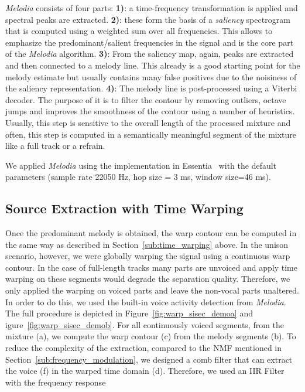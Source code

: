 \emph{Melodia} consists of four parts:
\noindent\textbf{1)}: a time-frequency transformation is applied and spectral peaks are extracted.
\textbf{2)}: these form the basis of a \emph{saliency} spectrogram that is computed using a weighted sum over all frequencies. This allows to emphasize the predominant/salient frequencies in the signal and is the core part of the \emph{Melodia} algorithm.
\textbf{3)}: From the saliency map, again, peaks are extracted and then connected to a melody line. This already is a good starting point for the melody estimate but usually contains many false positives due to the noisiness of the saliency representation.
\textbf{4)}: The melody line is post-processed using a Viterbi decoder.
The purpose of it is to filter the contour by removing outliers, octave jumps and improves the smoothness of the contour using a number of heuristics.
Usually, this step is sensitive to the overall length of the processed mixture and often, this step is computed in a semantically meaningful segment of the mixture like a full track or a refrain.
\par
We applied \emph{Melodia} using the implementation in Essentia~\cite{bogdanov13} with the default parameters (sample rate 22050 Hz, hop size = 3 ms, window size=46 ms).

\subsection{Source Extraction with Time Warping}

Once the predominant melody is obtained, the warp contour can be computed in the same way as described in Section~\ref{sub:time_warping} above.
In the unison scenario, however, we were globally warping the signal using a continuous warp contour.
In the case of full-length tracks many parts are unvoiced and apply time warping on these segments would degrade the separation quality.
Therefore, we only applied the warping on voiced parts and leave the non-vocal parts unaltered.
In order to do this, we used the built-in voice activity detection from \emph{Melodia}.
The full procedure is depicted in Figure~\ref{fig:warp_sisec_demoa} and igure~\ref{fig:warp_sisec_demob}.
For all continuously voiced segments, from the mixture (a), we compute the warp contour (c) from the melody segments (b).
To reduce the complexity of the extraction, compared to the NMF mentioned in Section~\ref{sub:frequency_modulation}, we designed a comb filter that can extract the voice (f) in the warped time domain (d).
Therefore, we used an IIR Filter with the frequency response

